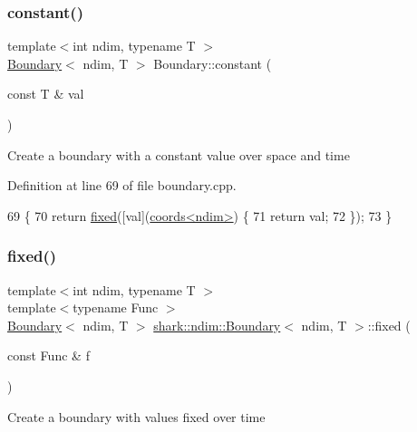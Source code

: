 \subsubsection{\texorpdfstring{constant()}{constant()}}
{\footnotesize\ttfamily template$<$int ndim, typename T $>$ \\
\hyperlink{classshark_1_1ndim_1_1_boundary}{Boundary}$<$ ndim, T $>$ Boundary\+::constant (\begin{DoxyParamCaption}\item[{const T \&}]{val }\end{DoxyParamCaption})\hspace{0.3cm}{\ttfamily [static]}}

Create a boundary with a constant value over space and time 

Definition at line 69 of file boundary.\+cpp.


\begin{DoxyCode}
69                                                         \{
70     \textcolor{keywordflow}{return} \hyperlink{classshark_1_1ndim_1_1_boundary_a713a06547690904ed24cdb3c92190ea5}{fixed}([val](\hyperlink{structshark_1_1ndim_1_1coords}{coords<ndim>}) \{
71         \textcolor{keywordflow}{return} val;
72     \});
73 \}
\end{DoxyCode}
\hypertarget{classshark_1_1ndim_1_1_boundary_a713a06547690904ed24cdb3c92190ea5}{}\label{classshark_1_1ndim_1_1_boundary_a713a06547690904ed24cdb3c92190ea5} 
\subsubsection{\texorpdfstring{fixed()}{fixed()}}
{\footnotesize\ttfamily template$<$int ndim, typename T $>$ \\
template$<$typename Func $>$ \\
\hyperlink{classshark_1_1ndim_1_1_boundary}{Boundary}$<$ ndim, T $>$ \hyperlink{classshark_1_1ndim_1_1_boundary}{shark\+::ndim\+::\+Boundary}$<$ ndim, T $>$\+::fixed (\begin{DoxyParamCaption}\item[{const Func \&}]{f }\end{DoxyParamCaption})\hspace{0.3cm}{\ttfamily [static]}}

Create a boundary with values fixed over time 

